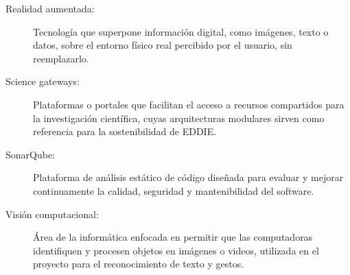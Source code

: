 \begin{glosario}
\begin{description}
  \item[Realidad aumentada:] Tecnología que superpone información digital, como imágenes, texto o datos, sobre el entorno físico real percibido por el usuario, sin reemplazarlo.
  \item[Science gateways:] Plataformas o portales que facilitan el acceso a recursos compartidos para la investigación científica, cuyas arquitecturas modulares sirven como referencia para la sostenibilidad de EDDIE.
  \item[SonarQube:] Plataforma de análisis estático de código diseñada para evaluar y mejorar continuamente la calidad, seguridad y mantenibilidad del software.
  \item[Visión computacional:] Área de la informática enfocada en permitir que las computadoras identifiquen y procesen objetos en imágenes o videos, utilizada en el proyecto para el reconocimiento de texto y gestos.
\end{description}
\end{glosario}
